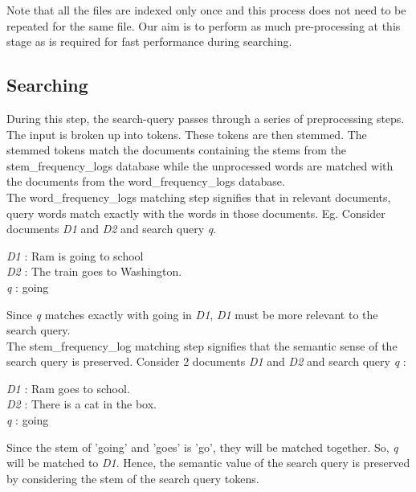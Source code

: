 \documentclass[12pt]{article}
\begin{document}
	
	Note that all the files are indexed only once and this process does not need to be repeated for the same file. Our aim is to perform as much pre-processing at this stage as is required for fast performance during searching.
	
	\subsection{Searching}
	During this step, the search-query passes through a series of preprocessing steps. The input is broken up into tokens. These tokens are then stemmed. The stemmed tokens match the documents containing the stems from the stem\_frequency\_logs database while the unprocessed words are matched with the documents from the word\_frequency\_logs database.\\
	
	The word\_frequency\_logs matching step signifies that in relevant documents, query words match exactly with the words in those documents. Eg. Consider documents \textit{D1} and \textit{D2} and search query \textit{q}.\\
	
	\begin{flushleft}
		\textit{D1} : Ram is going to school\\
		\textit{D2} : The train goes to Washington.\\
		\textit{q} : going\\
	\end{flushleft}
	
	Since \textit{q} matches exactly with going in \textit{D1}, \textit{D1} must be more relevant to the search query.\\
	
	The stem\_frequency\_log matching step signifies that the semantic sense of the search query is preserved. Consider 2 documents \textit{D1} and \textit{D2} and search query \textit{q} :
	\begin{flushleft}
		\textit{D1} : Ram goes to school.\\
		\textit{D2} : There is a cat in the box.\\
		\textit{q} : going  \\
	\end{flushleft}
	Since the stem of 'going' and 'goes' is 'go', they will be matched together. So, \textit{q} will be matched to \textit{D1}. Hence, the semantic value of the search query is preserved by considering the stem of the search query tokens.\\
	
\end{document}
